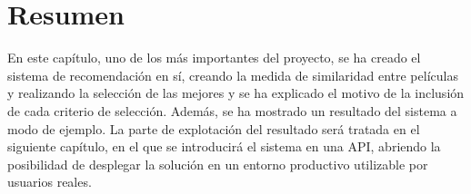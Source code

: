 \section{Resumen}

En este capítulo, uno de los más importantes del proyecto, se ha creado el sistema de recomendación en sí, creando la medida de similaridad entre películas y realizando la selección de las mejores y se ha explicado el motivo de la inclusión de cada criterio de selección. Además, se ha mostrado un resultado del sistema a modo de ejemplo. La parte de explotación del resultado será tratada en el siguiente capítulo, en el que se introducirá el sistema en una API, abriendo la posibilidad de desplegar la solución en un entorno productivo utilizable por usuarios reales.